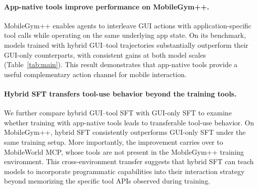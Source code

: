 \paragraph{App-native tools improve performance on MobileGym++.}
MobileGym++ enables agents to interleave GUI actions with application-specific tool calls while operating on the same underlying app state. On its benchmark, models trained with hybrid GUI--tool trajectories substantially outperform their GUI-only counterparts, with consistent gains at both model scales (Table~\ref{tab:main}). This result demonstrates that app-native tools provide a useful complementary action channel for mobile interaction.


\paragraph{Hybrid SFT transfers tool-use behavior beyond the training tools.}
We further compare hybrid GUI--tool SFT with GUI-only SFT to examine whether training with app-native tools leads to transferable tool-use behavior. On MobileGym++, hybrid SFT consistently outperforms GUI-only SFT under the same training setup. More importantly, the improvement carries over to MobileWorld MCP, whose tools are not present in the MobileGym++ training environment. This cross-environment transfer suggests that hybrid SFT can teach models to incorporate programmatic capabilities into their interaction strategy beyond memorizing the specific tool APIs observed during training.




